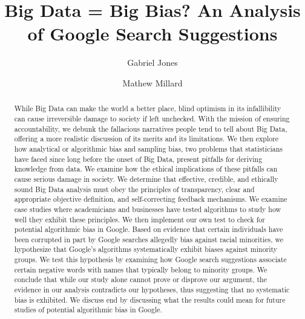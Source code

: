 \documentclass[sigconf]{acmart}
\begin{document}
\title{Big Data = Big Bias? An Analysis of Google Search Suggestions}

\author{Gabriel Jones}

\author{Mathew Millard}


\begin{abstract}
While Big Data can make the world a better place, blind optimism in its infallibility can cause irreversible damage to society if left unchecked. With the mission of ensuring accountability, we debunk the fallacious narratives people tend to tell about Big Data, offering a more realistic discussion of its merits and its limitations. We then explore how analytical or algorithmic bias and sampling bias, two problems that statisticians have faced since long before the onset of Big Data, present pitfalls for deriving knowledge from data. We examine how the ethical implications of these pitfalls can cause serious damage in society. We determine that effective, credible, and ethically sound Big Data analysis must obey the principles of transparency, clear and appropriate objective definition, and self-correcting feedback mechanisms. We examine case studies where academicians and businesses have tested algorithms to study how well they exhibit these principles. We then implement our own test to check for potential algorithmic bias in Google. Based on evidence that certain individuals have been corrupted in part by Google searches allegedly bias against racial minorities, we hypothesize that Google's algorithms systematically exhibit biases against minority groups. We test this hypothesis by examining how Google search suggestions associate certain negative words with names that typically belong to minority groups. We conclude that while our study alone cannot prove or disprove our argument, the evidence in our analysis contradicts our hypotheses, thus suggesting that no systematic bias is exhibited. We discuss end by discussing what the results could mean for future studies of potential algorithmic bias in Google.
\end{abstract}


\maketitle
\end{document}
